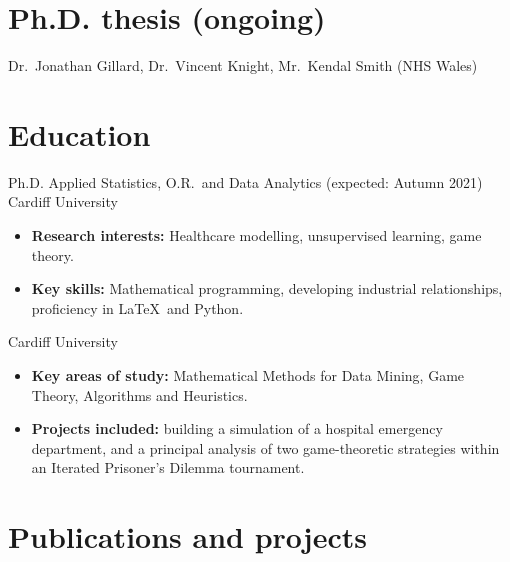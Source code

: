 \documentclass[10pt, sans, a4paper]{moderncv}
\begin{document}
\makecvtitle%

\vspace{-20pt}
\section{Ph.D. thesis (ongoing)}
%
    {Dr.\ Jonathan Gillard, Dr.\ Vincent Knight, Mr.\ Kendal Smith (NHS Wales)}

\section{Education}

%
    {Ph.D. Applied Statistics, O.R.\ and Data Analytics (expected: Autumn 2021)}%
    {Cardiff University}{}{}{%
    \begin{itemize}
        \item \textbf{Research interests:} Healthcare modelling, unsupervised
            learning, game theory.
        \item \textbf{Key skills:} Mathematical programming, developing
            industrial relationships, proficiency in \LaTeX\ and Python.
    \end{itemize}
}

%
    {Cardiff University}{}{}{%
        \begin{itemize}
            \item \textbf{Key areas of study:} Mathematical Methods for Data
                Mining, Game Theory, Algorithms and Heuristics.
            \item \textbf{Projects included:} building a simulation of a
                hospital emergency department, and a principal analysis of two
                game-theoretic strategies within an Iterated Prisoner's Dilemma
                tournament.
    \end{itemize}
}


\section{Publications and projects}
\end{document}
